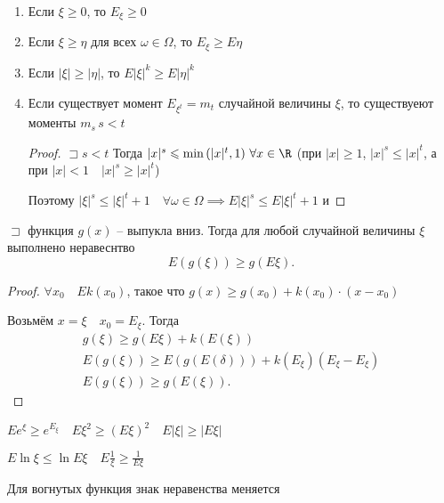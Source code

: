 \begin{property}
    \begin{enumerate}
        \item Если  $\xi\geqslant 0$, то $E_\xi\geqslant 0$
        \item Если $\xi \geqslant \eta$ для всех $\omega\in \Omega$, то $E_\xi \geqslant E\eta$
        \item Если $|\xi| \geqslant |\eta|$, то $E|\xi|^k \geqslant  E|\eta|^k$
        \item Если существует момент $E_{\xi^t} = m_t$ случайной величины  $\xi$, то существуеют моменты  $m_s\, s<t$
             \begin{proof}
                 $\sqsupset s<t$ Тогда $|x|^s \leqslant \min\left( |x|^t, 1 \right) \,\forall x\in \R$ (при $|x| \geqslant 1$, $|x|^s \leqslant |x|^t$, а при $|x|<1\quad |x|^s \geqslant  |x|^t$)

                 Поэтому $|\xi|^s \leqslant |\xi|^t + 1\quad \forall \omega\in\Omega \implies E|\xi|^s \leqslant E|\xi|^t + 1$ и
            \end{proof}
    \end{enumerate}
\end{property}

\begin{theorem}

    $\sqsupset $ функция $g(x)$ -- выпукла вниз. Тогда для любой случайной величины  $\xi$ выполнено неравеснтво
     \[
         E\left( g\left( \xi \right)  \right) \geqslant g\left( E\xi \right) 
    .\] 
\end{theorem}
\begin{proof}
    $\forall x_0\quad Ek\left( x_0 \right) $, такое что  $g(x) \geqslant g(x_0) + k\left( x_0 \right) \cdot \left( x-x_0 \right) $

    Возьмём $x = \xi\quad x_0 = E_\xi$. Тогда 
     \begin{align*}
         g\left( \xi \right) \geqslant g\left( E\xi \right) +k \left( E\left( \xi \right)  \right) \\
         E\left( g\left( \xi \right)  \right) \geqslant E\left( g\left( E\left( \delta \right)  \right)  \right) +k\left( E_\xi \right) \left( E_\xi - E_\xi \right) \\
         E\left( g\left( \xi \right)  \right) \geqslant g\left( E\left( \xi \right)  \right) 
    .\end{align*}
\end{proof}

\begin{example}
    $E e^\xi \geqslant e^{E_\xi}\quad E\xi^2 \geqslant \left( E\xi \right) ^2\quad E|\xi| \geqslant |E\xi|$

    $E\ln \xi \leqslant \ln E\xi\quad E \frac{1}{\xi}\geqslant \frac{1}{E\xi}$
\end{example}
\begin{note}
    Для вогнутых функция знак неравенства меняется
\end{note}





